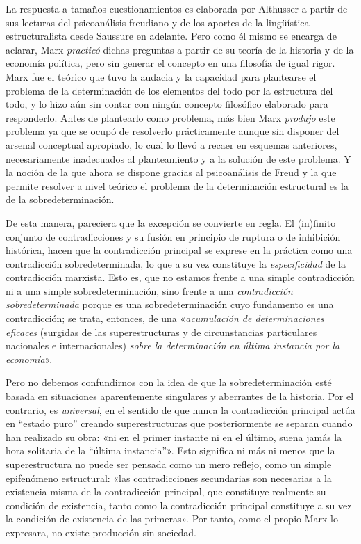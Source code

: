 La respuesta a tamaños cuestionamientos es elaborada por Althusser a partir de sus lecturas del psicoanálisis freudiano y de los aportes de la lingüística estructuralista desde Saussure en adelante. Pero como él mismo se encarga de aclarar, Marx \emph{practicó} dichas preguntas a partir de su teoría de la historia y de la economía política, pero sin generar el concepto en una filosofía de igual rigor. Marx fue el teórico que tuvo la audacia y la capacidad para plantearse el problema de la determinación de los elementos del todo por la estructura del todo, y lo hizo aún sin contar con ningún concepto filosófico elaborado para responderlo. Antes de plantearlo como problema, más bien Marx \emph{produjo} este problema ya que se ocupó de resolverlo prácticamente aunque sin disponer del arsenal conceptual apropiado, lo cual lo llevó a recaer en esquemas anteriores, necesariamente inadecuados al planteamiento y a la solución de este problema. Y la noción de la que ahora se dispone gracias al psicoanálisis de Freud y la que permite resolver a nivel teórico el problema de la determinación estructural es la de la sobredeterminación.

De esta manera, pareciera que la excepción se convierte en regla. El (in)finito conjunto de contradicciones y su fusión en principio de ruptura o de inhibición histórica, hacen que la contradicción principal se exprese en la práctica como una contradicción sobredeterminada, lo que a su vez constituye la \emph{especificidad} de la contradicción marxista. Esto es, que no estamos frente a una simple contradicción ni a una simple sobredeterminación, sino frente a una \emph{contradicción sobredeterminada} porque es una sobredeterminación cuyo fundamento es una contradicción; se trata, entonces, de una «\emph{acumulación de determinaciones eficaces }(surgidas de las superestructuras y de circunstancias particulares nacionales e internacionales) \emph{sobre la determinación en última instancia por la economía}».

Pero no debemos confundirnos con la idea de que la sobredeterminación esté basada en situaciones aparentemente singulares y aberrantes de la historia. Por el contrario, es \emph{universal}, en el sentido de que nunca la contradicción principal actúa en ``estado puro'' creando superestructuras que posteriormente se separan cuando han realizado su obra: «ni en el primer instante ni en el último, suena jamás la hora solitaria de la ``última instancia''». Esto significa ni más ni menos que la superestructura no puede ser pensada como un mero reflejo, como un simple epifenómeno estructural: «las contradicciones secundarias son necesarias a la existencia misma de la contradicción principal, que constituye realmente su condición de existencia, tanto como la contradicción principal constituye a su vez la condición de existencia de las primeras». Por tanto, como el propio Marx lo expresara, no existe producción sin sociedad.

